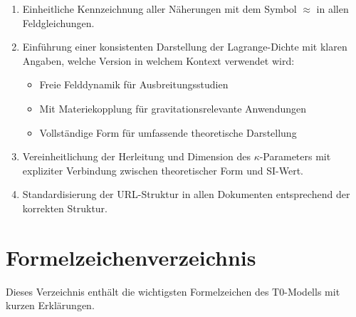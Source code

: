 \documentclass[12pt,a4paper]{article}
\begin{document}
	\begin{enumerate}[label=\textbf{M\arabic*.}]
		\item Einheitliche Kennzeichnung aller Näherungen mit dem Symbol $\approx$ in allen Feldgleichungen.
		
		\item Einführung einer konsistenten Darstellung der Lagrange-Dichte mit klaren Angaben, welche Version in welchem Kontext verwendet wird:
		\begin{itemize}
			\item Freie Felddynamik für Ausbreitungsstudien
			\item Mit Materiekopplung für gravitationsrelevante Anwendungen
			\item Vollständige Form für umfassende theoretische Darstellung
		\end{itemize}
		
		\item Vereinheitlichung der Herleitung und Dimension des $\kappa$-Parameters mit expliziter Verbindung zwischen theoretischer Form und SI-Wert.
		
		\item Standardisierung der URL-Struktur in allen Dokumenten entsprechend der korrekten Struktur.
	\end{enumerate}
	
	\section{Formelzeichenverzeichnis}
	
	\begin{tcolorbox}[colback=blue!5!white,colframe=blue!75!black,title=Formelzeichen des T0-Modells]
		Dieses Verzeichnis enthält die wichtigsten Formelzeichen des T0-Modells mit kurzen Erklärungen.
	\end{tcolorbox}
	
\end{document}
